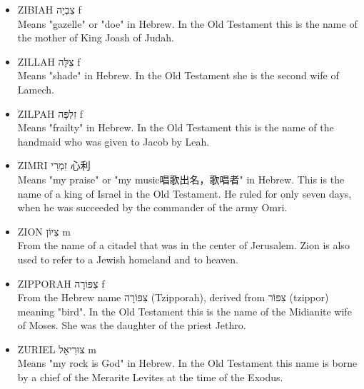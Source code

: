 \begin{itemize}
\item ZIBIAH צִבְיָה f \\
Means "gazelle" or "doe" in Hebrew. In the Old Testament this is the name of the mother of King Joash of Judah.
\item ZILLAH צִלָּה f \\
Means "shade" in Hebrew. In the Old Testament she is the second wife of Lamech.
\item ZILPAH זִלְפָּה f \\
Means "frailty" in Hebrew. In the Old Testament this is the name of the handmaid who was given to Jacob by Leah.
\item ZIMRI זִמְרִי 心利 \\
Means "my praise" or "my music唱歌出名，歌唱者" in Hebrew. This is the name of a king of Israel in the Old Testament. He ruled for only seven days, when he was succeeded by the commander of the army Omri.
\item ZION צִיוֹן m \\
From the name of a citadel that was in the center of Jerusalem. Zion is also used to refer to a Jewish homeland and to heaven.
\item ZIPPORAH צִפּוֹרָה f\\
From the Hebrew name צִפּוֹרָה (Tzipporah), derived from צִפּוֹר (tzippor) meaning "bird". In the Old Testament this is the name of the Midianite wife of Moses. She was the daughter of the priest Jethro.
\item ZURIEL צוּרִיאֵל m\\
Means "my rock is God" in Hebrew. In the Old Testament this name is borne by a chief of the Merarite Levites at the time of the Exodus.
\end{itemize}
 



　



